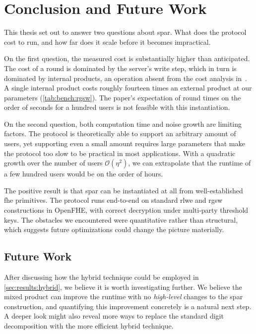 \chapter{Conclusion and Future Work}
\label{chp:conclusion}

\vfill
This thesis set out to answer two questions about \gls{spar}. What does the protocol cost to run, and how far does it scale before it becomes impractical.

On the first question, the measured cost is substantially higher than anticipated. The cost of a round is dominated by the server's write step, which in turn is dominated by internal products, an operation absent from the cost analysis in~\cite{cryptoeprint:2025/860}. A single internal product costs roughly fourteen times an external product at our parameters (\cref{tab:bench:rgsw}). The paper's expectation of round times on the order of seconds for a hundred users is not feasible with this instantiation.

On the second question, both computation time and noise growth are limiting factors. The protocol is theoretically able to support an arbitrary amount of users, yet supporting even a small amount requires large parameters that make the protocol too slow to be practical in most applications. With a quadratic growth over the number of users $\mathcal{O}(\eta^2)$, we can extrapolate that the runtime of a few hundred users would be on the order of hours.

The positive result is that \gls{spar} can be instantiated at all from well-established \gls{fhe} primitives. The protocol runs end-to-end on standard \gls{rlwe} and \gls{rgsw} constructions in OpenFHE, with correct decryption under multi-party threshold keys. The obstacles we encountered were quantitative rather than structural, which suggests future optimizations could change the picture materially.
\newpage

\section{Future Work}
After discussing how the hybrid technique could be employed in \cref{sec:results:hybrid}, we believe it is worth investigating further. We believe the mixed product can improve the runtime with no \emph{high-level} changes to the \gls{spar} construction, and quantifying this improvement concretely is a natural next step. A deeper look might also reveal more ways to replace the standard digit decomposition with the more efficient hybrid technique. 


